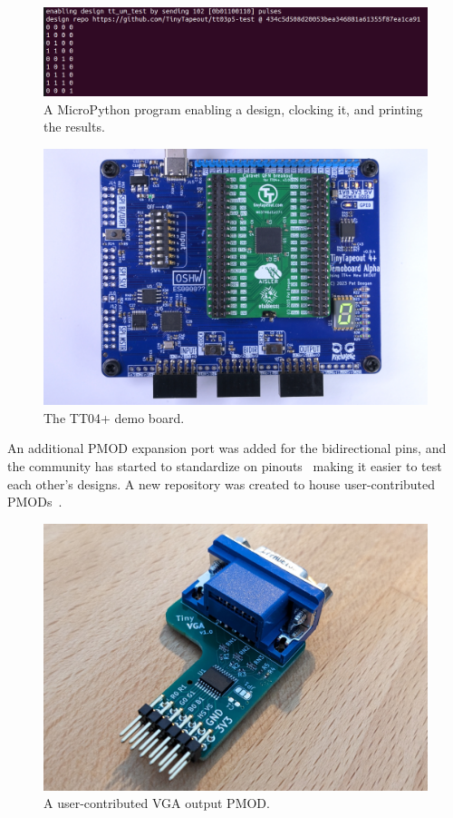 \begin{figure}[htp]
\centering
\includegraphics[width=\columnwidth]{./Figs/tt3p5 enable design.png}
\caption{A MicroPython program\cite{demofirmwaretest} enabling a design, clocking it, and printing the results.}
\label{fig:micropython_program}
\end{figure}

\begin{figure}[htp]
\centering
\includegraphics[width=\columnwidth]{./Figs/tt04-demoboard-top.jpg}
\caption{The TT04+ demo board\cite{tt04demoboard}.}
\label{fig:TT04plus_demo_board}
\end{figure}

An additional PMOD expansion port was added for the bidirectional pins, and the community has started to standardize on pinouts~\cite{pinouts} making it easier to test each other's designs.
A new repository was created to house user-contributed PMODs~\cite{awesomepmods}.

\begin{figure}[htp]
\centering
\includegraphics[width=\columnwidth]{./Figs/tiny_vga_pmod.jpg}
\caption{A user-contributed VGA output PMOD.}
\label{fig:user_contributed_VGA_PMOD}
\end{figure}

